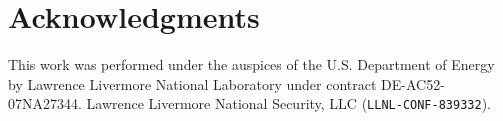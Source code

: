 \section*{Acknowledgments}
This work was performed under the auspices of the U.S. Department of Energy by Lawrence
Livermore National Laboratory under contract DE-AC52-07NA27344. Lawrence Livermore
National Security, LLC ({\tt LLNL-CONF-839332}).
